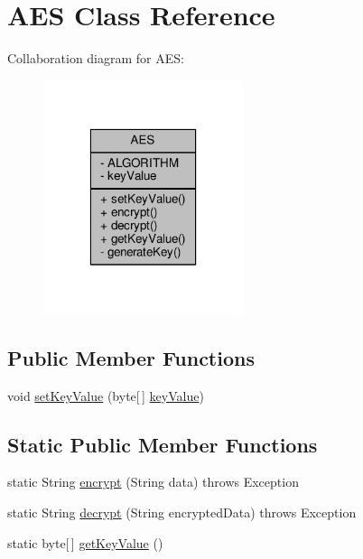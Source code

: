 \hypertarget{a00001}{\section{A\+E\+S Class Reference}
\label{a00001}
}


Collaboration diagram for A\+E\+S\+:
\nopagebreak
\begin{figure}[H]
\begin{center}
\leavevmode
\includegraphics[width=166pt]{a00071}
\end{center}
\end{figure}
\subsection*{Public Member Functions}
\begin{DoxyCompactItemize}
\item 
void \hyperlink{a00001_adac98388bd7c0bf94c3ac2c1987e3f14}{set\+Key\+Value} (byte\mbox{[}$\,$\mbox{]} \hyperlink{a00001_a1a9da325d5376125b139a98e7ff9d2e2}{key\+Value})
\end{DoxyCompactItemize}
\subsection*{Static Public Member Functions}
\begin{DoxyCompactItemize}
\item 
static String \hyperlink{a00001_a4961b27ef3efa77d9ed11ebadffe2c9b}{encrypt} (String data)  throws Exception 
\item 
static String \hyperlink{a00001_a3b7b86cb0a160857d40bd2145364f194}{decrypt} (String encrypted\+Data)  throws Exception 
\item 
static byte\mbox{[}$\,$\mbox{]} \hyperlink{a00001_a2ac0845b551e7ebd2bf47e1beac6df48}{get\+Key\+Value} ()
\end{DoxyCompactItemize}
